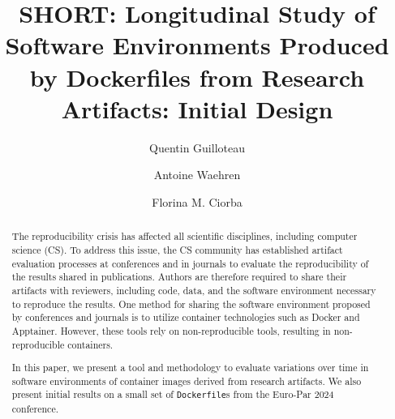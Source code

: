 \documentclass[sigconf,natbib=false]{acmart}
\newcommand{\df}{\texttt{Dockerfile}}
\begin{document}
\title{%
  SHORT: Longitudinal Study of Software Environments Produced by Dockerfiles from Research Artifacts: Initial Design%
}


\author{Quentin Guilloteau}

\author{Antoine Waehren}

\author{Florina M. Ciorba}




\begin{abstract}
  The reproducibility crisis has affected all scientific disciplines, including computer science (CS).
  To address this issue, the CS community has established artifact evaluation processes at conferences and in journals to evaluate the reproducibility of the results shared in publications.
  Authors are therefore required to share their artifacts with reviewers, including code, data, and the software environment necessary to reproduce the results.
  One method for sharing the software environment proposed by conferences and journals is to utilize container technologies such as Docker and Apptainer.
  However, these tools rely on non-reproducible tools, resulting in non-reproducible containers.

  In this paper, we present a tool and methodology to evaluate variations over time in software environments of container images derived from research artifacts.
  We also present initial results on a small set of \df s from the Euro-Par 2024 conference.
 
\end{abstract}
\end{document}

